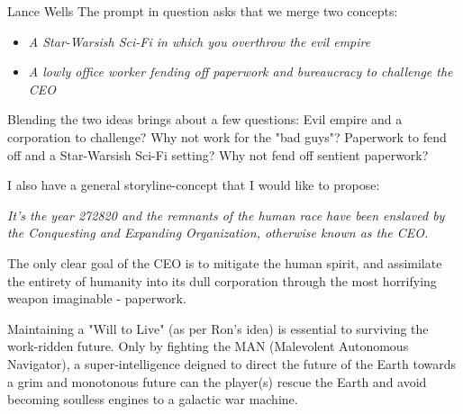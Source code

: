 \documentclass[12pt]{report}
\begin{document}
\begin{section}{Lance Wells}
The prompt in question asks that we merge two concepts:
\begin{itemize}
\item \emph{A Star-Warsish Sci-Fi in which you overthrow the evil empire}
\item \emph{A lowly office worker fending off paperwork and bureaucracy to challenge the CEO}
\end{itemize}

Blending the two ideas brings about a few questions:
Evil empire and a corporation to challenge? Why not work for the "bad guys"?
Paperwork to fend off and a Star-Warsish Sci-Fi setting? Why not fend off 
sentient paperwork?

I also have a general storyline-concept that I would like to propose:

\begin{center}
\emph{It's the year 272820 and the remnants of the human race have been
enslaved by the Conquesting and Expanding Organization, otherwise known as
the CEO.}
\end{center}

The only clear goal of the CEO is to mitigate the human spirit, and
assimilate the entirety of humanity into its dull corporation through the
most horrifying weapon imaginable - paperwork.

Maintaining a "Will to Live" (as per Ron's idea) is essential to surviving
the work-ridden future. Only by fighting the MAN (Malevolent Autonomous
Navigator), a super-intelligence deigned to direct the future of the Earth
towards a grim and monotonous future can the player(s) rescue the Earth and
avoid becoming soulless engines to a galactic war machine.
\end{section}
\end{document}
